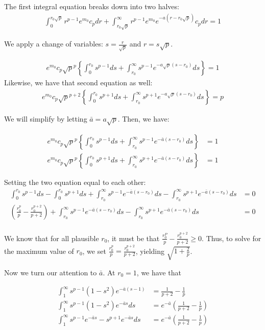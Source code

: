 \documentclass{article}
\begin{document}
The first integral equation breaks down into two halves:
\begin{align*}
\int_0^{r_0 \sqrt{p}} r^{p-1} e^{m_0} c_p dr + \int_{r_0 \sqrt{p}}^\infty r^{p-1} e^{m_0} e^{-a ( r - r_0 \sqrt{p} )} c_p dr = 1
\end{align*}

We apply a change of variables: $s = \frac{r}{\sqrt{p}}$ and $r = s\sqrt{p}$. 

\begin{align*}
e^{m_0} c_p \sqrt{p}^p \left\{
   \int_0^{r_0} s^{p-1} ds + \int_{r_0}^\infty s^{p-1} e^{- a \sqrt{p}(s - r_0)}  ds  \right\} = 1
\end{align*}
Likewise, we have that second equation as well:
\begin{align*}
e^{m_0} c_p \sqrt{p}^{p+2} \left\{
   \int_0^{r_0} s^{p+1} ds + \int_{r_0}^\infty s^{p+1} e^{- a \sqrt{p}(s - r_0)}  ds  \right\} = p
\end{align*}

We will simplify by letting $\bar{a} = a \sqrt{p}$. Then, we have:

\begin{align*}
e^{m_0} c_p \sqrt{p}^p \left\{
   \int_0^{r_0} s^{p-1} ds + \int_{r_0}^\infty s^{p-1} e^{- \bar{a} (s - r_0)}  ds  \right\} &= 1 \\
e^{m_0} c_p \sqrt{p}^p \left\{
   \int_0^{r_0} s^{p+1} ds + \int_{r_0}^\infty s^{p+1} e^{- \bar{a} (s - r_0)}  ds  \right\} &= 1
\end{align*}

Setting the two equation equal to each other:
\begin{align*}
\int_0^{r_0} s^{p-1} ds - \int_0^{r_0} s^{p+1} ds + 
        \int_{r_0}^\infty s^{p-1} e^{-\bar{a}(s - r_0)} ds - 
        \int_{r_0}^{\infty} s^{p+1} e^{- \bar{a} (s - r_0)} ds &= 0 \\
\left( \frac{r_0^p}{p} - \frac{r_0^{p+2}}{p+2} \right) + 
        \int_{r_0}^\infty s^{p-1} e^{-\bar{a}(s - r_0)} ds - 
        \int_{r_0}^{\infty} s^{p+1} e^{- \bar{a} (s - r_0)} ds &= 0 \\
\end{align*}

We know that for all plausible $r_0$, it must be that $\frac{r_0^P}{p} - \frac{r_0^{p+2}}{p+2} \geq 0$. Thus, 
to solve for the maximum value of $r_0$, we set $\frac{r_0^p}{p} = \frac{r_0^{p+2}}{p+2}$, yielding
$\sqrt{1 + \frac{2}{p}}$. 

Now we turn our attention to $\bar{a}$. At $r_0 = 1$, we have that

\begin{align*}
\int_{1}^\infty s^{p-1}(1 - s^2) e^{- \bar{a}(s - 1)} &= \frac{1}{p+2} - \frac{1}{p} \\
\int_{1}^\infty s^{p-1}(1 - s^2) e^{- \bar{a} s} ds &= e^{- \bar{a}} \left( \frac{1}{p+2} - \frac{1}{p} \right) \\
\int_{1}^\infty s^{p-1}  e^{- \bar{a} s} - s^{p+1} e^{ - \bar{a}s} ds &= e^{- \bar{a}} \left( \frac{1}{p+2} - \frac{1}{p} \right) \\
\end{align*}
\end{document}
